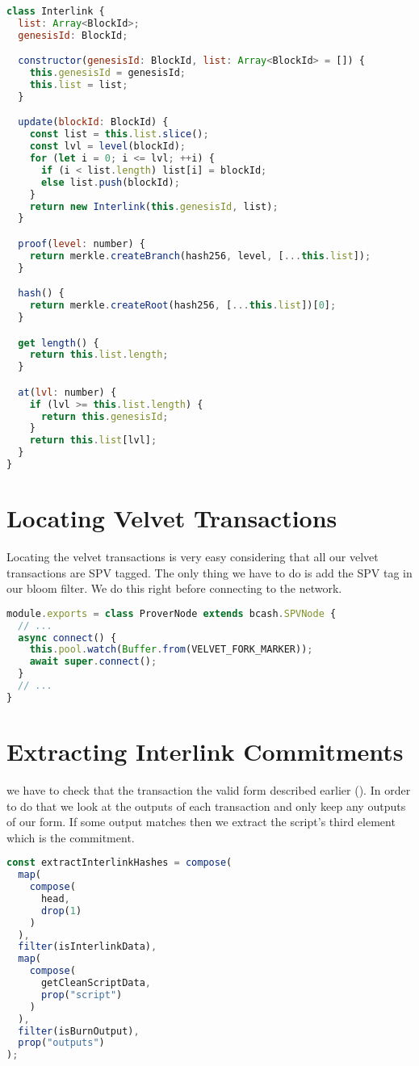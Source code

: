 \begin{lstlisting}[language=Javascript]
class Interlink {
  list: Array<BlockId>;
  genesisId: BlockId;

  constructor(genesisId: BlockId, list: Array<BlockId> = []) {
    this.genesisId = genesisId;
    this.list = list;
  }

  update(blockId: BlockId) {
    const list = this.list.slice();
    const lvl = level(blockId);
    for (let i = 0; i <= lvl; ++i) {
      if (i < list.length) list[i] = blockId;
      else list.push(blockId);
    }
    return new Interlink(this.genesisId, list);
  }

  proof(level: number) {
    return merkle.createBranch(hash256, level, [...this.list]);
  }

  hash() {
    return merkle.createRoot(hash256, [...this.list])[0];
  }

  get length() {
    return this.list.length;
  }

  at(lvl: number) {
    if (lvl >= this.list.length) {
      return this.genesisId;
    }
    return this.list[lvl];
  }
}
\end{lstlisting}

\section{Locating Velvet Transactions}
Locating the velvet transactions is very easy considering that all our velvet transactions are SPV tagged. The only thing we have to do is add the SPV tag in our bloom filter. We do this right before connecting to the network.

\begin{lstlisting}[language=Javascript]
module.exports = class ProverNode extends bcash.SPVNode {
  // ...
  async connect() {
    this.pool.watch(Buffer.from(VELVET_FORK_MARKER));
    await super.connect();
  }
  // ...
}
\end{lstlisting}

\section{Extracting Interlink Commitments}
we have to check that the transaction the valid form described earlier (). In order to do that we look at the outputs of each transaction and only keep any outputs of our form. If some output matches then we extract the script's third element which is the commitment.

\begin{lstlisting}[language=Javascript]
const extractInterlinkHashes = compose(
  map(
    compose(
      head,
      drop(1)
    )
  ),
  filter(isInterlinkData),
  map(
    compose(
      getCleanScriptData,
      prop("script")
    )
  ),
  filter(isBurnOutput),
  prop("outputs")
);
\end{lstlisting}

